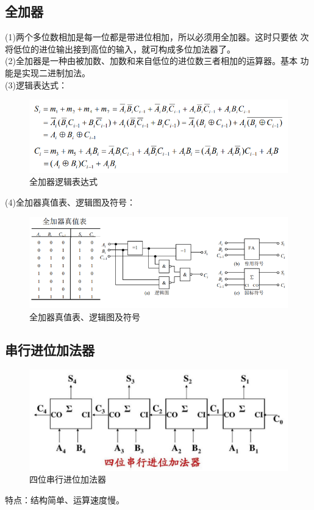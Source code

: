 \documentclass[a4paper,11pt,UTF8]{ctexart}
\begin{document}
 \subsection{全加器}
 (1)两个多位数相加是每一位都是带进位相加，所以必须用全加器。这时只要依
 次将低位的进位输出接到高位的输入，就可构成多位加法器了。\\
 (2)全加器是一种由被加数、加数和来自低位的进位数三者相加的运算器。基本
 功能是实现二进制加法。\\
 (3)逻辑表达式：
 \begin{figure}[H]
  \centering
  \includegraphics[width=12cm]{jfqpic3}
  \caption{全加器逻辑表达式}
  \label{fig:jfqpic3}
 \end{figure}
 (4)全加器真值表、逻辑图及符号：
 \begin{figure}[H]
  \centering
  \includegraphics[width=12cm]{jfqpic4}
  \caption{全加器真值表、逻辑图及符号}
  \label{fig:jfqpic4}
 \end{figure}
 \subsection{串行进位加法器}
 \begin{figure}[H]
  \centering
  \includegraphics[width=14cm]{jfqpic5}
  \caption{四位串行进位加法器}
  \label{fig:jfqpic5}
 \end{figure}
 特点：结构简单、运算速度慢。
\end{document}
